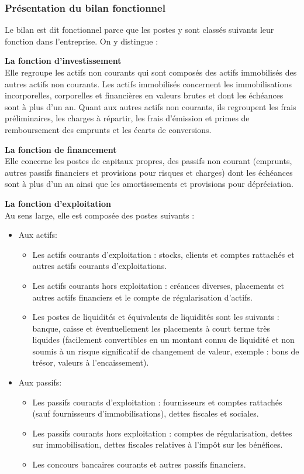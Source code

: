 \documentclass[a4paper,10pt]{article}
\begin{document}
	\subsubsection{Présentation du bilan fonctionnel}
	Le bilan est dit fonctionnel parce que les postes y sont classés suivants leur fonction dans l'entreprise. On y distingue :\\
	\par \textbf{La fonction d'investissement}\\
	Elle regroupe les actifs non courants qui sont composés des actifs immobilisés des autres actifs non courants. Les actifs immobilisés concernent les immobilisations incorporelles, corporelles et financières en valeurs brutes et dont les échéances sont à plus d'un an. Quant aux autres actifs non courants, ils regroupent les frais préliminaires, les charges à répartir, les frais d'émission et primes de remboursement des emprunts et les écarts de conversions. 
	\par \textbf{La fonction de financement}\\
	Elle concerne les postes de capitaux propres, des passifs non courant (emprunts, autres passifs financiers et provisions pour risques et charges) dont les échéances sont à plus d'un an ainsi que les amortissements et provisions pour dépréciation.
	\par \textbf{La fonction d'exploitation }\\
	Au sens large, elle est composée des postes suivants : \\
	\begin{itemize}
	\item Aux actifs:
	\begin{itemize}
	\item  Les actifs courants d'exploitation : stocks, clients et comptes rattachés et autres actifs courants d'exploitations.
	\item Les actifs courants hors exploitation : créances diverses, placements et autres actifs financiers et le compte de régularisation d'actifs.
	\item Les postes de liquidités et équivalents de liquidités sont les suivants : banque, caisse et éventuellement les placements à court terme très liquides (facilement convertibles en un montant connu de liquidité et non soumis à un risque significatif de changement de valeur, exemple : bons de trésor, valeurs à l'encaissement).
	\end{itemize}
	\item Aux passifs:
	\begin{itemize}
	\item  Les passifs courants d'exploitation : fournisseurs et comptes rattachés (sauf fournisseurs d'immobilisations), dettes fiscales et sociales.
	\item  Les passifs courants hors exploitation : comptes de régularisation, dettes sur immobilisation, dettes fiscales relatives à l'impôt sur les bénéfices.
	\item Les concours bancaires courants et autres passifs financiers.
	\end{itemize}
	\end{itemize}
\end{document}
